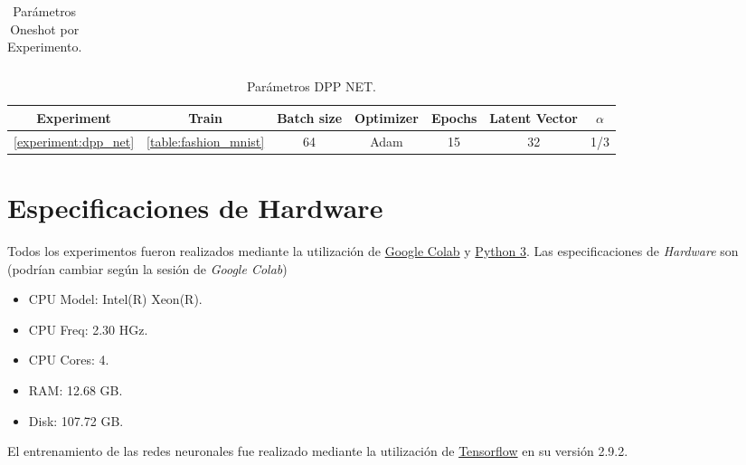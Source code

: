\begin{appendixs}
\begin{table}[ht]
\begin{tabular}{|c|c|c|c|c|c|c|}
    \end{tabular}
    \caption{Parámetros Oneshot por Experimento.}
    \label{table:oneshot_parameters}
    \end{table}
    
    
    \begin{table}[ht]
    \begin{tabular}{|c|c|c|c|c|c|c|}
    \hline
    Experiment & Train & Batch size & Optimizer & Epochs & Latent Vector & $\alpha$ \\ \hline
    \ref{experiment:dpp_net}      & \ref{table:fashion_mnist}    & 64       & Adam      & 15     & 32                & 1/3         \\ \hline
    
    \end{tabular}
    \caption{Parámetros DPP NET.}
    \label{table:dppnet_parameters}
    \end{table}
    
    \section{Especificaciones de Hardware}
    
    Todos los experimentos fueron realizados mediante la utilización de \href{https://colab.research.google.com/?hl=es}{Google Colab} y \href{https://www.python.org}{Python 3}. Las especificaciones de \textit{Hardware} son (podrían cambiar según la sesión de \textit{Google Colab})
    
    \begin{itemize}
        \item CPU Model: Intel(R) Xeon(R).
        \item CPU Freq: 2.30 HGz.
        \item CPU Cores: 4.
        \item RAM: 12.68 GB.
        \item Disk: 107.72 GB.
    \end{itemize}
    
    El entrenamiento de las redes neuronales fue realizado mediante la utilización de \href{https://www.tensorflow.org}{Tensorflow} en su versión 2.9.2. 

  
    

    
    
    
    
    
    

    
    
\end{appendixs}
